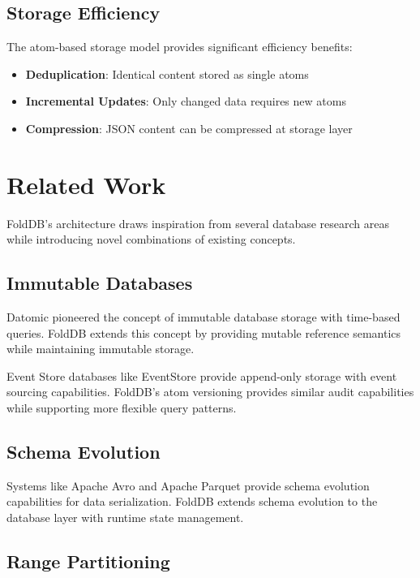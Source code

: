 \documentclass[11pt,a4paper]{article}
\begin{document}
\subsection{Storage Efficiency}

The atom-based storage model provides significant efficiency benefits:

\begin{itemize}
\item \textbf{Deduplication}: Identical content stored as single atoms
\item \textbf{Incremental Updates}: Only changed data requires new atoms
\item \textbf{Compression}: JSON content can be compressed at storage layer
\end{itemize}

\section{Related Work}

FoldDB's architecture draws inspiration from several database research areas while introducing novel combinations of existing concepts.

\subsection{Immutable Databases}

Datomic \cite{hickey2012datomic} pioneered the concept of immutable database storage with time-based queries. FoldDB extends this concept by providing mutable reference semantics while maintaining immutable storage.

Event Store databases like EventStore \cite{eventstore} provide append-only storage with event sourcing capabilities. FoldDB's atom versioning provides similar audit capabilities while supporting more flexible query patterns.

\subsection{Schema Evolution}

Systems like Apache Avro \cite{apache2015avro} and Apache Parquet \cite{apache2013parquet} provide schema evolution capabilities for data serialization. FoldDB extends schema evolution to the database layer with runtime state management.

\subsection{Range Partitioning}
\end{document}
